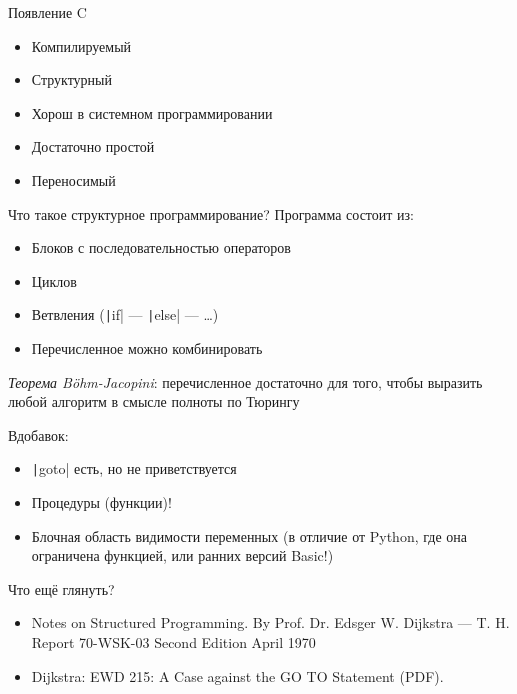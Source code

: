 \documentclass[xetex,aspectratio=169]{beamer}
\begin{document}
\begin{frame}{Появление C}
	\begin{itemize}
		\item Компилируемый
		\item Структурный
		\item Хорош в системном программировании
		\item Достаточно простой
        \item Переносимый
	\end{itemize}
\end{frame}

\begin{frame}{Что такое структурное программирование?}
	Программа состоит из:
	\begin{itemize}
		\item Блоков с последовательностью операторов
		\item Циклов
		\item Ветвления (\texttt|if| --- \texttt|else| --- \ldots)
		\item Перечисленное можно комбинировать
	\end{itemize}
	\pause

	\emph{Теорема B\"{o}hm-Jacopini}: перечисленное достаточно для того, чтобы выразить любой алгоритм в смысле полноты по Тюрингу
	\pause

	Вдобавок:
	\begin{itemize}
		\item \texttt|goto| есть, но не приветствуется
		\item Процедуры (функции)!
		\item Блочная область видимости переменных (в отличие от Python, где она ограничена функцией, или ранних версий Basic!)
	\end{itemize}
\end{frame}

\begin{frame}{Что ещё глянуть?}
	\begin{itemize}
		\item Notes on Structured Programming. By Prof. Dr. Edsger W. Dijkstra — T. H. Report 70-WSK-03 Second Edition April 1970
		\item Dijkstra: EWD 215: A Case against the GO TO Statement (PDF).
	\end{itemize}
\end{frame}
\end{document}
